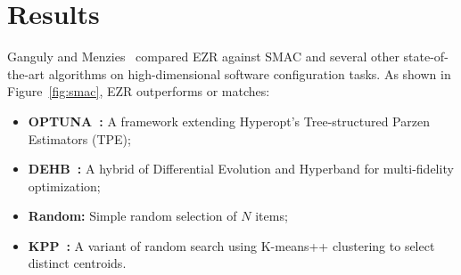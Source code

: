 \documentclass[pdflatex,sn-basic]{sn-jnl}
\begin{document}
\section{Results}
Ganguly and Menzies~\citep{datalite} compared EZR against SMAC and
several other state-of-the-art algorithms on high-dimensional
software configuration tasks. As shown in Figure~\ref{fig:smac}, EZR
outperforms or matches:
\begin{itemize}
    \item \textbf{OPTUNA~\citep{akiba2019optuna}:} A framework
    extending Hyperopt's Tree-structured Parzen Estimators (TPE);
    \item \textbf{DEHB~\citep{awad2021dehb}:} A hybrid of Differential
    Evolution and Hyperband for multi-fidelity optimization;
    \item \textbf{Random:} Simple random selection of $N$ items;
    \item \textbf{KPP~\citep{Arthur2007}:} A variant of random search
    using K-means++ clustering to select distinct centroids.
\end{itemize}
\end{document}
